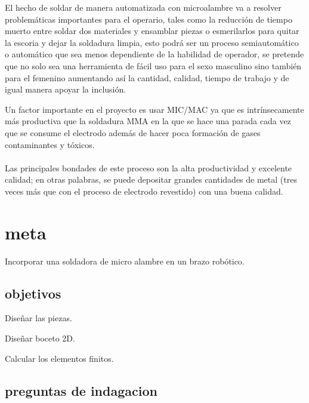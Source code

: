 \documentclass[12pt,letterpaper]{article}
\begin{document}
\begin{flushleft}
El hecho de soldar de manera automatizada con microalambre va a resolver problemáticas importantes para el operario, tales como la reducción de tiempo muerto entre soldar dos materiales y ensamblar piezas o esmerilarlos para quitar la escoria y dejar la soldadura limpia, esto podrá ser un proceso semiautomático o automático que sea menos dependiente de la habilidad de operador, se pretende que no solo sea una herramienta de fácil uso para el sexo masculino sino también para el femenino aumentando así la cantidad, calidad, tiempo de trabajo y de igual manera  apoyar la inclusión.
\end{flushleft}
Un factor importante en el proyecto es usar MIC/MAC ya que es intrínsecamente más productiva que la soldadura MMA en la que se hace una parada cada vez que se consume el electrodo además de hacer poca formación de gases contaminantes y tóxicos.
\\\\
Las principales bondades de este proceso son la alta productividad y excelente calidad; en otras palabras, se puede depositar grandes cantidades de metal (tres veces más que con el proceso de electrodo revestido) con una buena calidad.


\section*{meta}

\begin{flushleft}
Incorporar una soldadora de micro alambre en un brazo robótico.
\end{flushleft}

\subsection*{objetivos}
\begin{flushleft}
Diseñar las piezas.
\end{flushleft}
\begin{flushleft}
Diseñar boceto 2D.
\end{flushleft}
\begin{flushleft}
Calcular los elementos finitos.
\end{flushleft}

\subsection*{preguntas de indagacion}
\end{document}
